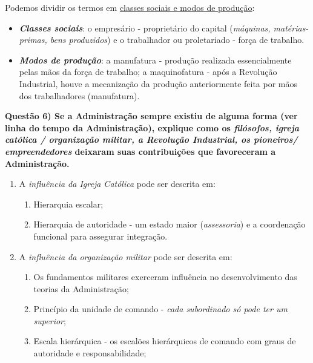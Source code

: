\documentclass{article}
\begin{document}
\par Podemos dividir os termos em \underline{classes sociais e modos de produção}:
\begin{itemize}
    \item \textbf{\emph{Classes sociais}}: o empresário - proprietário do capital (\emph{máquinas, matérias-primas, bens produzidos}) e o trabalhador ou proletariado - força de trabalho.
    \item \textbf{\emph{Modos de produção}}: a manufatura - produção realizada essencialmente pelas mãos da força de trabalho; a maquinofatura - após a Revolução Industrial, houve a mecanização da produção anteriormente feita por mãos dos trabalhadores (manufatura).
\end{itemize}

\noindent \textbf{Questão 6) Se a Administração sempre existiu de alguma forma (ver linha do tempo da Administração), explique como os \emph{filósofos, igreja católica / organização militar, a Revolução Industrial, os pioneiros/ empreendedores} deixaram suas contribuições que favoreceram a Administração.}
\begin{enumerate}
    \item A \emph{influência da Igreja Católica} pode ser descrita em:
          \begin{enumerate}
              \item Hierarquia escalar;
              \item Hierarquia de autoridade - um estado maior (\emph{assessoria}) e a coordenação funcional para assegurar integração.
          \end{enumerate}
    \item A \emph{influência da organização militar} pode ser descrita em:
          \begin{enumerate}
              \item Os fundamentos militares exerceram influência no desenvolvimento das teorias da Administração;
              \item Princípio da unidade de comando - \emph{cada subordinado só pode ter um superior};
              \item Escala hierárquica - os escalões hierárquicos de comando com graus de autoridade e responsabilidade;
          \end{enumerate}
\end{enumerate}
\end{document}
